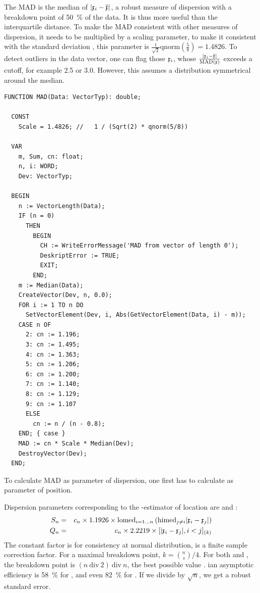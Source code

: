 \begin{refsection}
The \acf{MAD} \parencite{Rou-93} is the median of \( |\mathfrak{x}_i - \breve{\mathfrak{x}}| \), a robust measure of dispersion with a breakdown point of \SI{50}{\%} of the data. It is thus more useful than the interquartile distance. To make the \acs{MAD} consistent with other measures of dispersion, it needs to be multiplied by a scaling parameter, to make it consistent with the standard deviation \skalar{\sigma}, this parameter is \( \frac{1}{\sqrt{2}} \mathrm{qnorm}\left(\frac{5}{8}\right) = \num{1.4826} \). To detect outliers in the data vector, one can flag those \( \mathfrak{x}_i \), whose \( \frac{|\mathfrak{x}_i - \breve{\mathfrak{x}}|}{\mathrm{MAD}(\mathfrak{x})} \) exceeds a cutoff, for example \num{2.5} or \num{3.0}. However, this assumes a distribution symmetrical around the median.

\begin{lstlisting}[caption=median absolute deviation from median (MAD)]
  FUNCTION MAD(Data: VectorTyp): double;

  CONST
    Scale = 1.4826; //   1 / (Sqrt(2) * qnorm(5/8))

  VAR
    m, Sum, cn: float;
    n, i: WORD;
    Dev: VectorTyp;

  BEGIN
    n := VectorLength(Data);
    IF (n = 0)
      THEN
        BEGIN
          CH := WriteErrorMessage('MAD from vector of length 0');
          DeskriptError := TRUE;
          EXIT;
        END;
    m := Median(Data);
    CreateVector(Dev, n, 0.0);
    FOR i := 1 TO n DO
      SetVectorElement(Dev, i, Abs(GetVectorElement(Data, i) - m));
    CASE n OF
      2: cn := 1.196;
      3: cn := 1.495;
      4: cn := 1.363;
      5: cn := 1.206;
      6: cn := 1.200;
      7: cn := 1.140;
      8: cn := 1.129;
      9: cn := 1.107
      ELSE
        cn := n / (n - 0.8);
    END; { case }
    MAD := cn * Scale * Median(Dev);
    DestroyVector(Dev);
  END;
\end{lstlisting}

To calculate \acs{MAD} as parameter of dispersion, one first has to calculate  as parameter of position.

Dispersion parameters corresponding to the -estimator of location are  and  \parencite{Rou-93}:
\begin{eqnarray}
  S_n &=& c_n \times 1.1926 \times \mathrm{lomed}_{i = 1\ldots n}\left(\mathrm{himed}_{j \neq i} |\mathfrak{x}_i - \mathfrak{x}_j|\right)\\
  Q_n &=& c_n \times 2.2219 \times [|\mathfrak{x}_i - \mathfrak{x}_j|, i < j]_{(k)}
\end{eqnarray}
The constant factor is for consistency at normal distribution,  is a finite sample correction factor. For a maximal breakdown point, \( k = \binom{n}{s}/4 \). For both  and , the breakdown point is \( (n\ \mathrm{div}\ 2)\ \mathrm{div}\ n \), the best possible value \parencite{Cro-92}. ian asymptotic efficiency is \SI{58}{\%} for , and even \SI{82}{\%} for . If we divide  by \( \sqrt{n} \), we get a robust standard error.


\end{refsection}
